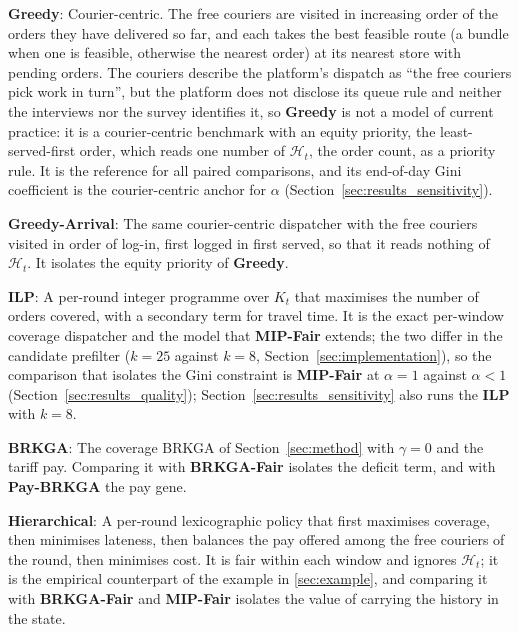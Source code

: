 \documentclass[a4paper,11pt,review,3p,authoryear]{elsarticle}
\newcommand{\Hist}{\mathcal{H}}
\begin{document}
\begin{compactitem}
    \item \textbf{Greedy}: Courier-centric. The free couriers are visited in increasing order of the orders they have delivered so far, and each takes the best feasible route (a bundle when one is feasible, otherwise the nearest order) at its nearest store with pending orders. The couriers describe the platform's dispatch as \enquote{the free couriers pick work in turn}, but the platform does not disclose its queue rule and neither the interviews nor the survey identifies it, so \textbf{Greedy} is not a model of current practice: it is a courier-centric benchmark with an equity priority, the least-served-first order, which reads one number of $\Hist_t$, the order count, as a priority rule. It is the reference for all paired comparisons, and its end-of-day Gini coefficient is the courier-centric anchor for $\alpha$ (Section~\ref{sec:results_sensitivity}).

    \item \textbf{Greedy-Arrival}: The same courier-centric dispatcher with the free couriers visited in order of log-in, first logged in first served, so that it reads nothing of $\Hist_t$. It isolates the equity priority of \textbf{Greedy}.

    \item \textbf{ILP}: A per-round integer programme over $K_t$ that maximises the number of orders covered, with a secondary term for travel time. It is the exact per-window coverage dispatcher and the model that \textbf{MIP-Fair} extends; the two differ in the candidate prefilter ($k = 25$ against $k = 8$, Section~\ref{sec:implementation}), so the comparison that isolates the Gini constraint is \textbf{MIP-Fair} at $\alpha = 1$ against $\alpha < 1$ (Section~\ref{sec:results_quality}); Section~\ref{sec:results_sensitivity} also runs the \textbf{ILP} with $k = 8$.

    \item \textbf{BRKGA}: The coverage BRKGA of Section~\ref{sec:method} with $\gamma = 0$ and the tariff pay. Comparing it with \textbf{BRKGA-Fair} isolates the deficit term, and with \textbf{Pay-BRKGA} the pay gene.

    \item \textbf{Hierarchical}: A per-round lexicographic policy that first maximises coverage, then minimises lateness, then balances the pay offered among the free couriers of the round, then minimises cost. It is fair within each window and ignores $\Hist_t$; it is the empirical counterpart of the example in \ref{sec:example}, and comparing it with \textbf{BRKGA-Fair} and \textbf{MIP-Fair} isolates the value of carrying the history in the state.
\end{compactitem}
\end{document}
